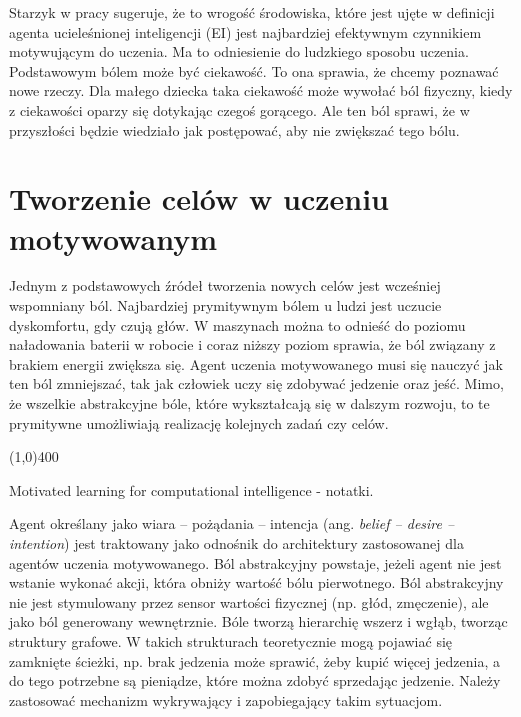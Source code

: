 Starzyk w pracy \cite{motivation_in_ei} sugeruje, że to wrogość środowiska, 
które jest ujęte w definicji agenta ucieleśnionej inteligencji (EI) jest 
najbardziej efektywnym czynnikiem motywującym do uczenia. Ma to odniesienie do 
ludzkiego sposobu uczenia. Podstawowym bólem może być ciekawość. To ona 
sprawia, że chcemy poznawać nowe rzeczy. Dla małego dziecka taka ciekawość może 
wywołać ból fizyczny, kiedy z ciekawości oparzy się dotykając czegoś gorącego. 
Ale ten ból sprawi, że w przyszłości będzie wiedziało jak postępować, aby nie 
zwiększać tego bólu.

\section{Tworzenie celów w uczeniu motywowanym}

Jednym z podstawowych źródeł tworzenia nowych celów jest wcześniej wspomniany 
ból. Najbardziej prymitywnym bólem u ludzi jest uczucie dyskomfortu, gdy czują 
głów. W maszynach można to odnieść do poziomu naładowania baterii w robocie i 
coraz niższy poziom sprawia, że ból związany z brakiem energii zwiększa się. 
Agent uczenia motywowanego musi się nauczyć jak ten ból zmniejszać, tak jak 
człowiek uczy się zdobywać jedzenie oraz jeść. Mimo, że wszelkie abstrakcyjne 
bóle, które wykształcają się w dalszym rozwoju, to te prymitywne umożliwiają 
realizację kolejnych zadań czy celów.




\begin{center}
	\line(1,0){400} 
\end{center}

Motivated learning for computational intelligence - notatki.

Agent określany jako wiara -- pożądania -- intencja (ang. \textit{belief -- 
desire -- intention}) jest traktowany jako odnośnik do architektury zastosowanej 
dla agentów uczenia motywowanego.
Ból abstrakcyjny powstaje, jeżeli agent nie jest wstanie wykonać akcji, która
obniży wartość bólu pierwotnego.
Ból abstrakcyjny nie jest stymulowany przez sensor wartości fizycznej (np. głód, 
zmęczenie), ale jako ból generowany wewnętrznie.
Bóle tworzą hierarchię wszerz i wgłąb, tworząc struktury grafowe. 
W takich strukturach teoretycznie mogą pojawiać się zamknięte ścieżki, np. brak
jedzenia może sprawić, żeby kupić więcej jedzenia, a do tego potrzebne są 
pieniądze, które można zdobyć sprzedając jedzenie.
Należy zastosować mechanizm wykrywający i zapobiegający takim sytuacjom.

